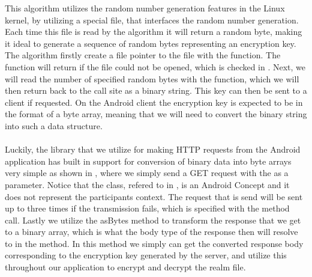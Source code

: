 
\FloatBarrier

This algorithm utilizes the random number generation features in the Linux kernel, by utilizing a special file,  that interfaces the random number generation. Each time this file is read by the algorithm it will return a random byte, making it ideal to generate a sequence of random bytes representing an encryption key. The algorithm firstly create a file pointer to the  file with the  function. The function will return  if the file could not be opened, which is checked in . Next, we will read the number of specified random bytes with the  function, which we will then return back to the call site as a binary string. This key can then be sent to a client if requested. On the Android client the encryption key is expected to be in the format of a byte array, meaning that we will need to convert the binary string into such a data structure. 
\\\\
Luckily, the library that we utilize for making HTTP requests from the Android application has built in support for conversion of binary data into byte arrays very simple as shown in , where we simply send a GET request with the  as a parameter. Notice that the  class, refered to in , is an Android Concept and it does not represent the participants context. The request that is send will be sent up to three times if the transmission fails, which is specified with the  method call. Lastly we utilize the asBytes method to transform the response that we get to a binary array, which is what the body type of the response then will resolve to in the  method. In this method we simply can get the converted response body corresponding to the encryption key generated by the server, and utilize this throughout our application to encrypt and decrypt the realm file.    

\FloatBarrier

